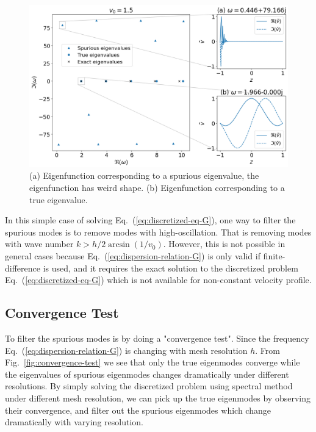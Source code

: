 \begin{figure}[htbp!]
	\centering
	\includegraphics[width=\textwidth]{figures/eigenmodes-FD.png}
	\caption{(a) Eigenfunction corresponding to a spurious eigenvalue, the eigenfunction has weird shape. (b) Eigenfunction corresponding to a true eigenvalue.}
	\label{fig:eigenmodes-FD}
\end{figure}

In this simple case of solving Eq.~(\ref{eq:discretized-eq-G}), one way to filter the spurious modes is to remove modes with high-oscillation. That is removing modes with wave number $k>h/2 \arcsin(1/v_0)$. However, this is not possible in general cases because Eq.~(\ref{eq:dispersion-relation-G}) is only valid if finite-difference is used, and it requires the exact solution to the discretized problem Eq.~(\ref{eq:discretized-eq-G}) which is not available for non-constant velocity profile.

\subsection{Convergence Test}
To filter the spurious modes is by doing a "convergence test". Since the frequency Eq.~(\ref{eq:dispersion-relation-G}) is changing with mesh resolution $h$. From Fig.~\ref{fig:convergence-test} we see that only the true eigenmodes converge while the eigenvalues of spurious eigenmodes changes dramatically under different resolutions. By simply solving the discretized problem using spectral method under different mesh resolution, we can pick up the true eigenmodes by observing their convergence, and filter out the spurious eigenmodes which change dramatically with varying resolution.


